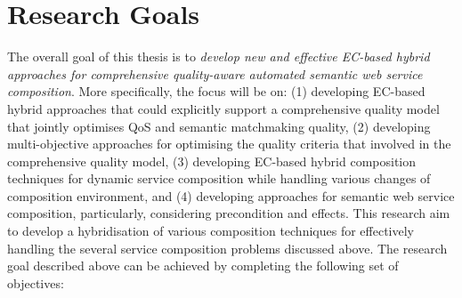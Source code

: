 \section{Research Goals}
The overall goal of this thesis is to \emph{develop new and effective EC-based hybrid approaches for comprehensive quality-aware automated semantic web service composition}. More specifically, the focus will be on: (1) developing EC-based hybrid approaches that could explicitly support a comprehensive quality model that jointly optimises QoS and semantic matchmaking quality, (2) developing multi-objective approaches for optimising the quality criteria that involved in the comprehensive quality model, (3) developing EC-based hybrid composition techniques for dynamic service composition while handling various changes of composition environment, and  (4) developing approaches for semantic web service composition, particularly, considering precondition and effects. This research aim to develop a hybridisation of various composition techniques for effectively handling the several service composition problems discussed above. The research goal described above can be achieved by completing the following set of objectives:


